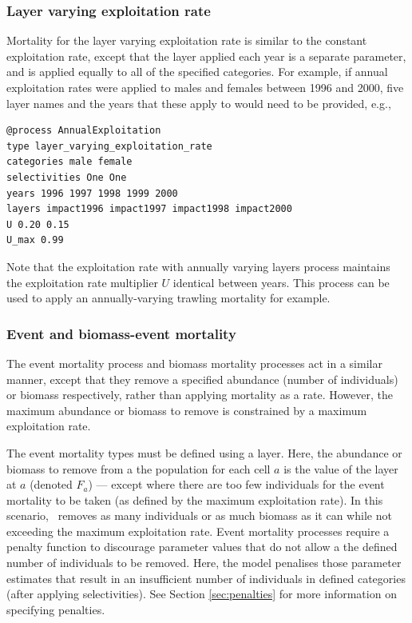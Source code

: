 \subsubsection*{Layer varying exploitation rate}

Mortality for the layer varying exploitation rate is similar to the constant exploitation rate, except that the layer applied each year is a separate parameter, and is applied equally to all of the specified categories. For example, if annual exploitation rates were applied to males and females between 1996 and 2000, five layer names and the years that these apply to would need to be provided, e.g., 
{\small{\begin{verbatim}
@process AnnualExploitation
type layer_varying_exploitation_rate
categories male female
selectivities One One
years 1996 1997 1998 1999 2000
layers impact1996 impact1997 impact1998 impact2000
U 0.20 0.15
U_max 0.99
\end{verbatim}}}

Note that the exploitation rate with annually varying layers process maintains the exploitation rate multiplier $U$ identical between years. This process can be used to apply an annually-varying trawling mortality for example.

\subsubsection*{Event and biomass-event mortality}

The event mortality process and biomass mortality processes act in a similar manner, except that they remove a specified abundance (number of individuals) or biomass respectively, rather than applying mortality as a rate. However, the maximum abundance or biomass to remove is constrained by a maximum exploitation rate.

The event mortality types must be defined using a layer. Here, the abundance or biomass to remove from a the population for each cell $a$ is the value of the layer at $a$ (denoted $F_a$) --- except where there are too few individuals for the event mortality to be taken (as defined by the maximum exploitation rate). In this scenario, \SPM\ removes as many individuals or as much biomass as it can while not exceeding the maximum exploitation rate. Event mortality processes require a penalty function to discourage parameter values that do not allow a the defined number of individuals to be removed. Here, the model penalises those parameter estimates that result in an insufficient number of individuals in defined categories (after applying selectivities). See Section \ref{sec:penalties} for more information on specifying penalties.

